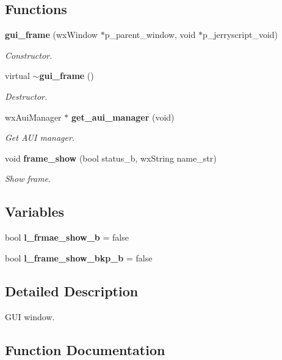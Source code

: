 \subsection*{Functions}
\begin{DoxyCompactItemize}
\item 
\textbf{ gui\+\_\+frame} (wx\+Window $\ast$p\+\_\+parent\+\_\+window, void $\ast$p\+\_\+jerryscript\+\_\+void)
\begin{DoxyCompactList}\small\item\em Constructor. \end{DoxyCompactList}\item 
virtual \textbf{ $\sim$gui\+\_\+frame} ()
\begin{DoxyCompactList}\small\item\em Destructor. \end{DoxyCompactList}\item 
wx\+Aui\+Manager $\ast$ \textbf{ get\+\_\+aui\+\_\+manager} (void)
\begin{DoxyCompactList}\small\item\em Get A\+UI manager. \end{DoxyCompactList}\item 
void \textbf{ frame\+\_\+show} (bool status\+\_\+b, wx\+String name\+\_\+str)
\begin{DoxyCompactList}\small\item\em Show frame. \end{DoxyCompactList}\end{DoxyCompactItemize}
\subsection*{Variables}
\begin{DoxyCompactItemize}
\item 
bool \textbf{ l\+\_\+frmae\+\_\+show\+\_\+b} = false
\item 
\mbox{\label{group___g_u_i_ga3cc19a2072731606e8ffd6e87a18e4ce}} 
bool {\bfseries l\+\_\+frame\+\_\+show\+\_\+bkp\+\_\+b} = false
\end{DoxyCompactItemize}


\subsection{Detailed Description}
G\+UI window. 



\subsection{Function Documentation}
\mbox{\label{group___g_u_i_gac4c1be9127e4da3a01fba733688653be}} 
